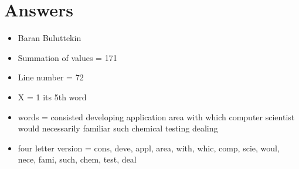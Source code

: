 \documentclass[12pt]{article}
\begin{document}
    \section*{Answers}
    \begin{itemize}
        \item Baran Buluttekin
        \item Summation of values = 171
        \item Line number = 72
        \item X = 1 its 5th word
        \item words = consisted developing application area with which computer scientist would necessarily familiar such chemical testing dealing
        \item four letter version = cons, deve, appl, area, with, whic, comp, scie, woul, nece, fami, such, chem, test, deal  
    \end{itemize}
\end{document}
